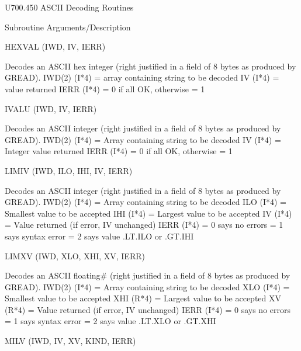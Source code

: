  
   U700.450  ASCII Decoding Routines
 
 
   Subroutine          Arguments/Description
 
   HEXVAL             (IWD, IV, IERR)
 
                       Decodes an ASCII hex integer (right justified in a
                       field of 8 bytes as produced by GREAD).
                       IWD(2)  (I*4) = array containing string to be decoded
                       IV      (I*4) = value returned
                       IERR    (I*4) = 0 if all OK, otherwise = 1
 
   IVALU              (IWD, IV, IERR)
 
                       Decodes an ASCII integer (right justified in a field
                       of 8 bytes as produced by GREAD).
                       IWD(2)  (I*4) = Array containing string to be decoded
                       IV      (I*4) = Integer value returned
                       IERR    (I*4) = 0 if all OK, otherwise = 1
 
   LIMIV              (IWD, ILO, IHI, IV, IERR)
 
                       Decodes an ASCII integer (right justified in a field
                       of 8 bytes as produced by GREAD).
                       IWD(2)  (I*4) = Array containing string to be decoded
                       ILO     (I*4) = Smallest value to be accepted
                       IHI     (I*4) = Largest  value to be accepted
                       IV      (I*4) = Value returned (if error, IV unchanged)
                       IERR    (I*4) = 0 says no errors
                                     = 1 says syntax error
                                     = 2 says value .LT.ILO  or  .GT.IHI
 
   LIMXV              (IWD, XLO, XHI, XV, IERR)
 
                       Decodes an ASCII floating# (right justified in a field
                       of 8 bytes as produced by GREAD).
                       IWD(2)  (I*4) = Array containing string to be decoded
                       XLO     (I*4) = Smallest value to be accepted
                       XHI     (R*4) = Largest  value to be accepted
                       XV      (R*4) = Value returned (if error, IV unchanged)
                       IERR    (I*4) = 0 says no errors
                                     = 1 says syntax error
                                     = 2 says value .LT.XLO  or  .GT.XHI
 
   MILV               (IWD, IV, XV, KIND, IERR)
 
